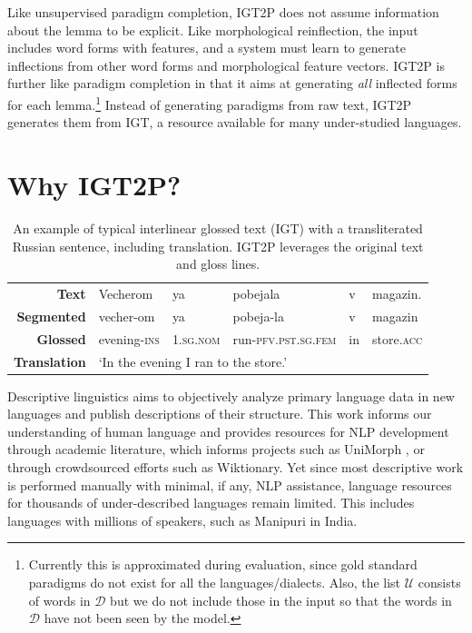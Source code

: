 Like unsupervised paradigm completion, IGT2P does not assume information about the lemma to be explicit. Like morphological reinflection, the input includes word forms with features, and a system must learn to generate inflections from other word forms and morphological feature vectors. 
IGT2P is further like paradigm completion in that it aims at generating \textit{all} inflected forms for each lemma.\footnote{Currently this is approximated during evaluation, since gold standard paradigms do not exist for all the languages/dialects. Also, the list $\mathcal{U}$ consists of words in $\mathcal{D}$ but we do not include those in the input so that the words in $\mathcal{D}$ have not been seen by the model.} Instead of generating paradigms from raw text, IGT2P generates them from IGT, a resource available for many under-studied languages.


\section{Why IGT2P?}

\begin{table}[tb]
    \centering
    \begin{tabular}{rlllll}
       \textbf{Text}  & Vecherom & ya & pobejala & v & magazin. \\
      \textbf{Segmented}   & vecher-om & ya & pobeja-la & v & magazin \\
      \textbf{Glossed} & evening-\textsc{ins} & \textsc{1.sg.nom} & run-\textsc{pfv.pst.sg.fem} & in & store.\textsc{acc} \\
      \textbf{Translation} & \multicolumn{5}{l}{`In the evening I ran to the store.'}
    \end{tabular}
    \caption[IGT example]{An example of typical interlinear glossed text (IGT) with a transliterated Russian sentence, including translation. IGT2P leverages the original text and gloss lines.}
    \label{tab:IGT}
\end{table}


Descriptive linguistics aims to objectively analyze primary language data in new languages and publish descriptions of their structure. This work informs our understanding of human language and provides resources for NLP development through academic literature, which informs projects such as UniMorph \citep{kirov_unimorph}, or through crowdsourced efforts such as Wiktionary. Yet since most descriptive work is performed manually with minimal, if any, NLP assistance, language resources for thousands of under-described languages remain limited. This includes languages with millions of speakers, such as Manipuri in India.

